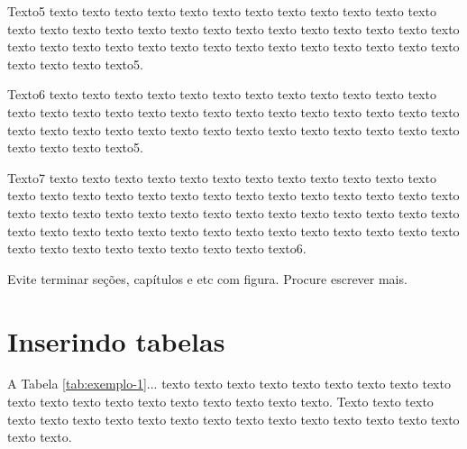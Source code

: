     Texto5 texto texto texto texto texto texto texto texto texto texto texto texto texto texto texto texto texto texto texto texto texto texto texto texto texto texto texto texto texto texto texto texto texto texto texto texto texto texto texto texto texto texto texto texto5.

    Texto6 texto texto texto texto texto texto texto texto texto texto texto texto texto texto texto texto texto texto texto texto texto texto texto texto texto texto texto texto texto texto texto texto texto texto texto texto texto texto texto texto texto texto texto texto5.

    Texto7 texto texto texto texto texto texto texto texto texto texto texto texto texto texto texto texto texto texto texto texto texto texto texto texto texto texto texto texto texto texto texto texto texto texto texto texto texto texto texto texto texto texto texto texto texto texto texto texto texto texto texto texto texto texto texto texto texto texto texto texto texto texto texto6.

    Evite terminar seções, capítulos e etc com figura. Procure escrever mais.

\section{Inserindo tabelas}\label{sec:tabelas}
    
    A Tabela \ref{tab:exemplo-1}... texto texto texto texto texto texto texto texto texto texto texto texto texto texto texto texto texto texto texto. Texto texto texto texto texto texto texto texto texto texto texto texto texto texto texto texto texto texto texto.
	
	\begin{table}[!h]
	\captionsetup{width=7cm}%
    \end{table}

